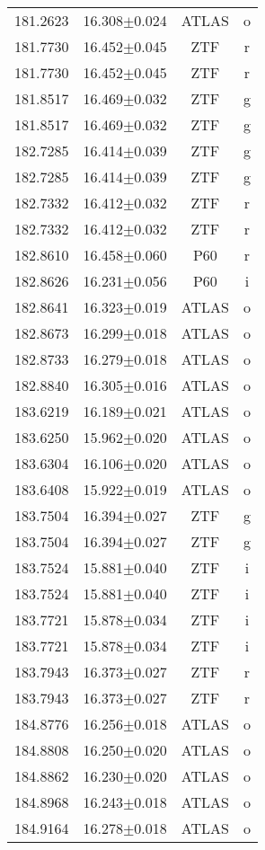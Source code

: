 \begin{table}
\begin{tabular}{cccc}
181.2623 & 16.308$\pm$0.024 & ATLAS & o \\
181.7730 & 16.452$\pm$0.045 & ZTF & r \\
181.7730 & 16.452$\pm$0.045 & ZTF & r \\
181.8517 & 16.469$\pm$0.032 & ZTF & g \\
181.8517 & 16.469$\pm$0.032 & ZTF & g \\
182.7285 & 16.414$\pm$0.039 & ZTF & g \\
182.7285 & 16.414$\pm$0.039 & ZTF & g \\
182.7332 & 16.412$\pm$0.032 & ZTF & r \\
182.7332 & 16.412$\pm$0.032 & ZTF & r \\
182.8610 & 16.458$\pm$0.060 & P60 & r \\
182.8626 & 16.231$\pm$0.056 & P60 & i \\
182.8641 & 16.323$\pm$0.019 & ATLAS & o \\
182.8673 & 16.299$\pm$0.018 & ATLAS & o \\
182.8733 & 16.279$\pm$0.018 & ATLAS & o \\
182.8840 & 16.305$\pm$0.016 & ATLAS & o \\
183.6219 & 16.189$\pm$0.021 & ATLAS & o \\
183.6250 & 15.962$\pm$0.020 & ATLAS & o \\
183.6304 & 16.106$\pm$0.020 & ATLAS & o \\
183.6408 & 15.922$\pm$0.019 & ATLAS & o \\
183.7504 & 16.394$\pm$0.027 & ZTF & g \\
183.7504 & 16.394$\pm$0.027 & ZTF & g \\
183.7524 & 15.881$\pm$0.040 & ZTF & i \\
183.7524 & 15.881$\pm$0.040 & ZTF & i \\
183.7721 & 15.878$\pm$0.034 & ZTF & i \\
183.7721 & 15.878$\pm$0.034 & ZTF & i \\
183.7943 & 16.373$\pm$0.027 & ZTF & r \\
183.7943 & 16.373$\pm$0.027 & ZTF & r \\
184.8776 & 16.256$\pm$0.018 & ATLAS & o \\
184.8808 & 16.250$\pm$0.020 & ATLAS & o \\
184.8862 & 16.230$\pm$0.020 & ATLAS & o \\
184.8968 & 16.243$\pm$0.018 & ATLAS & o \\
184.9164 & 16.278$\pm$0.018 & ATLAS & o \\

\end{tabular}
\end{table}
